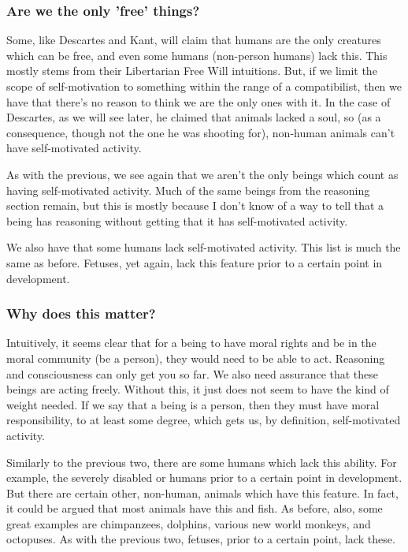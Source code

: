 \subsubsection{Are we the only 'free' things?}

Some, like Descartes and Kant, will claim that humans are the only creatures which can be free, and even some humans (non-person humans) lack this. This mostly stems from their Libertarian Free Will intuitions. But, if we limit the scope of self-motivation to something within the range of a compatibilist, then we have that there's no reason to think we are the only ones with it. In the case of Descartes, as we will see later, he claimed that animals lacked a soul, so (as a consequence, though not the one he was shooting for), non-human animals can't have self-motivated activity. 

As with the previous, we see again that we aren't the only beings which count as having self-motivated activity. Much of the same beings from the reasoning section remain, but this is mostly because I don't know of a way to tell that a being has reasoning without getting that it has self-motivated activity.

We also have that some humans lack self-motivated activity. This list is much the same as before. Fetuses, yet again, lack this feature prior to a certain point in development.

\subsubsection{Why does this matter?}

Intuitively, it seems clear that for a being to have moral rights and be in the moral community (be a person), they would need to be able to act. Reasoning and consciousness can only get you so far. We also need assurance that these beings are acting freely. Without this, it just does not seem to have the kind of weight needed. If we say that a being is a person, then they must have moral responsibility, to at least some degree, which gets us, by definition, self-motivated activity.  

Similarly to the previous two, there are some humans which lack this ability. For example, the severely disabled or humans prior to a certain point in development. But there are certain other, non-human, animals which have this feature. In fact, it could be argued that most animals have this and fish. As before, also, some great examples are chimpanzees, dolphins, various new world monkeys, and octopuses. As with the previous two, fetuses, prior to a certain point, lack these. 

